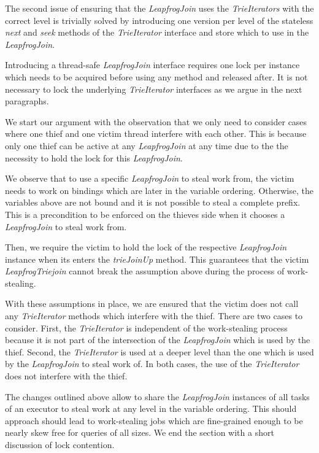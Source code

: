 The second issue of ensuring that the \textit{LeapfrogJoin} uses the \textit{TrieIterators} with
the correct level is trivially solved by introducing one version per level of the stateless \textit{next}
and \textit{seek} methods of the \textit{TrieIterator} interface and store which to use in the
\textit{LeapfrogJoin}.

Introducing a thread-safe \textit{LeapfrogJoin} interface requires one lock per instance which
needs to be acquired before using any method and released after.
It is not necessary to lock the underlying \textit{TrieIterator} interfaces as we argue in the next
paragraphs.

We start our argument with the observation that we only need to consider cases where one thief and one victim
thread interfere with each other.
This is because only one thief can be active at any \textit{LeapfrogJoin} at any time due to the
the necessity to hold the lock for this \textit{LeapfrogJoin}.

We observe that to use a specific \textit{LeapfrogJoin} to steal work from, the
victim needs to work on bindings which are later in the variable ordering.
Otherwise, the variables above are not bound and it is not possible to steal a complete prefix.
This is a precondition to be enforced on the thieves side when it chooses a \textit{LeapfrogJoin}
to steal work from.

Then, we require the victim to hold the lock of the respective \textit{LeapfrogJoin}
instance when its enters the \textit{trieJoinUp} method.
This guarantees that the victim \textit{LeapfrogTriejoin} cannot break the assumption above during the process
of work-stealing.

With these assumptions in place, we are ensured that the victim does not call
any \textit{TrieIterator} methods which interfere with the thief.
There are two cases to consider.
First, the \textit{TrieIterator} is independent of the work-stealing process because it is not
part of the intersection of the \textit{LeapfrogJoin} which is used by the thief.
Second, the \textit{TrieIterator} is used at a deeper level than the one which is used by the
\textit{LeapfrogJoin} to steal work of.
In both cases, the use of the \textit{TrieIterator} does not interfere with the thief.

The changes outlined above allow to share the \textit{LeapfrogJoin} instances of all
tasks of an executor to steal work at any level in the variable ordering.
This should approach should lead to work-stealing jobs which are fine-grained enough
to be nearly skew free for queries of all sizes.
We end the section with a short discussion of lock contention.


